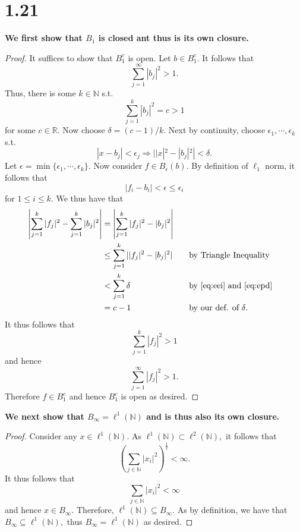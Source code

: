 \documentclass[10pt]{article}
\begin{document}
\section*{1.21}

\textbf{We first show that $B_1$ is closed ant thus is its own closure.}
\begin{proof}
    It suffices to show that $B^c_1$ is open. Let $b\in B^c_1.$ It follows that
    \[\sum_{j=1}^\infty |b_j|^2 > 1.\]
    Thus, there is some $k\in\mathbb{N}$ s.t.
    \begin{equation*}
        \sum_{j=1}^{k}|b_j|^2 = c > 1
    \end{equation*}
    for some $c\in\mathbb{R}.$ Now choose $\delta = (c-1)/k.$ Next by continuity, choose $\epsilon_1,\cdots,\epsilon_k$ s.t.
    \begin{equation} \label{eq:epd}
        |x -b_j|<\epsilon_j \Rightarrow ||x|^2-|b_j|^2| < \delta.
    \end{equation}
    Let $\epsilon = \min\{\epsilon_1,\cdots, \epsilon_k\}.$ Now consider $f \in B_\epsilon(b).$ By definition of $\ell_1$ norm, it follows that
    \begin{equation} \label{eq:eei}
        |f_i-b_i|<\epsilon\le\epsilon_i
    \end{equation}
    for $1\le i\le k.$ We thus have that
    \begin{alignat*}{2}
        \left | \sum_{j=1}^{k} |f_j|^2 - \sum_{j=1}^{k}|b_j|^2 \right |&=\left | \sum_{j=1}^{k}|f_j|^2 - |b_j|^2 \right | \\
        &\le \sum_{j=1}^{k} | |f_j|^2 - |b_j|^2 | \quad&&\text{by Triangle Inequality}\\
        &< \sum_{j=1}^{k} \delta &&\text{by \eqref{eq:eei} and \eqref{eq:epd}}\\
        &= c-1 &&\text{by our def. of $\delta$}.
    \end{alignat*}
    It thus follows that 
    \[\sum_{j=1}^{k} |f_j|^2 > 1\]
    and hence
    \[\sum_{j=1}^{\infty} |f_j|^2 > 1.\]
    Therefore $f \in B_1^c$ and hence $B^c_1$ is open as desired.
\end{proof}

\noindent
\textbf{We next show that $B_\infty = \ell^1(\mathbb{N})$ and is thus also its own closure.}

\begin{proof}
    Consider any $x \in \ell^1(\mathbb{N}).$ As $\ell^1(\mathbb{N})\subset \ell^2(\mathbb{N}),$ it follows that
    \[\left(\sum_{j\in\mathbb{N}} |x_i|^2\right)^{\frac{1}{2}}<\infty.\]
    It thus follows that
    \[\sum_{j\in\mathbb{N}} |x_i|^2 < \infty\]
    and hence $x \in B_\infty.$ Therefore, $\ell^1(\mathbb{N})\subseteq B_\infty.$ As by definition, we have that $B_\infty\subseteq\ell^1(\mathbb{N}),$
    thus $B_\infty = \ell^1(\mathbb{N})$ as desired.
\end{proof}
\end{document}
